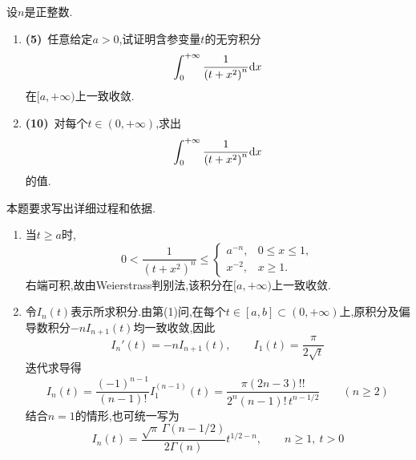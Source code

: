 \documentclass{ctexart}
\begin{document}
\begin{problem}[8.(15\songti{分})]
设$n$是正整数.
        \begin{enumerate}[label=\tbf{(\arabic*)},topsep=0pt,parsep=0pt,itemsep=0pt,partopsep=0pt]
            \item \textbf{(5)}\ 任意给定$a>0$,试证明含参变量$t$的无穷积分
                \[\int_0^{+\infty}\dfrac{1}{\left(t+x^2\right)^n}\mathrm{d} x\]
                在$[a,+\infty)$上一致收敛.
            \item \textbf{(10)}\ 对每个$t\in(0,+\infty)$,求出
                \[\int_0^{+\infty}\dfrac{1}{\left(t+x^2\right)^n}\mathrm{d} x\]
                的值.
        \end{enumerate}
        本题要求写出详细过程和依据.
\end{problem}
\begin{solution}
\begin{enumerate}[label=\tbf{(\arabic*)},topsep=0pt,parsep=0pt,itemsep=0pt,partopsep=0pt]
\item 当$t\geqslant a$时,
\[0<\frac1{(t+x^2)^n}\leqslant
\begin{cases}a^{-n},&0\leqslant x\leqslant1,\\x^{-2},&x\geqslant1.\end{cases}\]
右端可积,故由Weierstrass判别法,该积分在$[a,+\infty)$上一致收敛.
\item 令$I_n(t)$表示所求积分.由第(1)问,在每个$t\in[a,b]\subset(0,+\infty)$上,原积分及偏导数积分$-nI_{n+1}(t)$均一致收敛,因此
\[I_n'(t)=-nI_{n+1}(t),\qquad I_1(t)=\frac\pi{2\sqrt t}\]
迭代求导得
\[I_n(t)=\frac{(-1)^{n-1}}{(n-1)!}I_1^{(n-1)}(t)
=\frac{\pi(2n-3)!!}{2^n(n-1)!\,t^{n-1/2}}\qquad(n\geqslant2)\]
结合$n=1$的情形,也可统一写为
\[I_n(t)=\frac{\sqrt\pi\,\Gamma(n-1/2)}{2\Gamma(n)}t^{1/2-n},\qquad n\geqslant1,\ t>0\]
\end{enumerate}
\end{solution}
\end{document}
